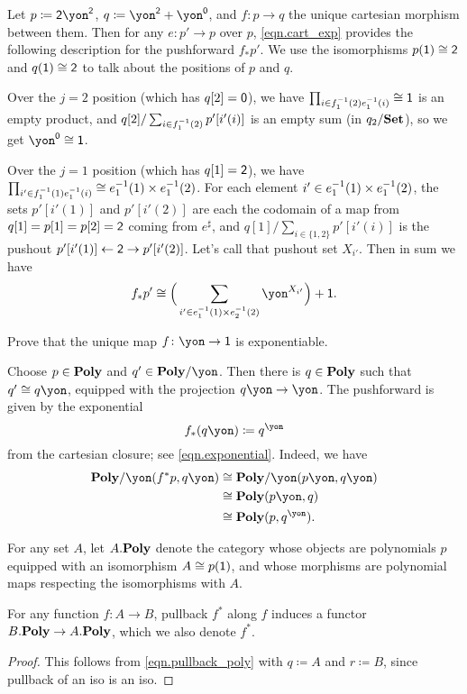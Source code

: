 \documentclass[Book-Poly]{subfiles}
\begin{document}
\begin{example}
Let $p\coloneqq\2\yon^\2$, $q\coloneqq\yon^\2+\yon^\0$, and $f\colon p\to q$ the unique cartesian morphism between them. Then for any $e\colon p'\to p$ over $p$, \eqref{eqn.cart_exp} provides the following description for the pushforward $f_*p'$. We use the isomorphisms $p(\1)\cong\2$ and $q(\1)\cong\2$ to talk about the positions of $p$ and $q$.

Over the $j=2$ position (which has $q[2]=\0$), we have $\prod_{i\in f_1\inv(2)e_1\inv(i)}\cong\1$ is an empty product, and $q[2]/\sum_{i\in f_1\inv(2)}p'[i'(i)]$ is an empty sum (in $q_2/\smset$), so we get $\yon^\0\cong\1$.

Over the $j=1$ position (which has $q[1]=\2$), we have $\prod_{i'\in f_1\inv(1)e_1\inv(i)}\cong e_1\inv(1)\times e_1\inv(2)$. For each element $i'\in e_1\inv(1)\times e_1\inv(2)$, the sets $p'[i'(1)]$ and $p'[i'(2)]$ are each the codomain of a map from $q[1]=p[1]=p[2]=\2$ coming from $e^\sharp$, and $q[1]/\sum_{i\in\{1,2\}}p'[i'(i)]$ is the pushout $p'[i'(1)]\from\2\to p'[i'(2)]$. Let's call that pushout set $X_{i'}$. Then in sum we have
\[
f_*p'\cong\Big(\sum_{i'\in e_1\inv(1)\times e_2\inv(2)}\yon^{X_{i'}}\Big)+\1.
\]
\end{example}

\begin{exercise}
Prove that the unique map $f\colon\yon\to\1$ is exponentiable.
\begin{solution}
Choose $p\in\poly$ and $q'\in\poly/\yon$. Then there is $q\in\poly$ such that $q'\cong q\yon$, equipped with the projection $q\yon\to\yon$. The pushforward is given by the exponential
\[f_*(q\yon)\coloneqq q^\yon\]
from the cartesian closure; see \eqref{eqn.exponential}. Indeed, we have
\begin{align*}
	\poly/\yon(f^*p,q\yon)&\cong
	\poly/\yon(p\yon,q\yon)\\&\cong
	\poly(p\yon,q)\\&\cong
	\poly(p,q^\yon).
\end{align*}
\end{solution}
\end{exercise}




For any set $A$, let $\poly[A.]$ denote the category whose objects are polynomials $p$ equipped with an isomorphism $A\cong p(\1)$, and whose morphisms are polynomial maps respecting the isomorphisms with $A$.

\begin{proposition}\label{prop.basechange}
For any function $f\colon A\to B$, pullback $f^*$ along $f$ induces a functor $\poly[B.]\to\poly[A.]$, which we also denote $f^*$.
\end{proposition}
\begin{proof}
This follows from \eqref{eqn.pullback_poly} with $q\coloneqq A$ and $r\coloneqq B$, since pullback of an iso is an iso.
\end{proof}
\end{document}
